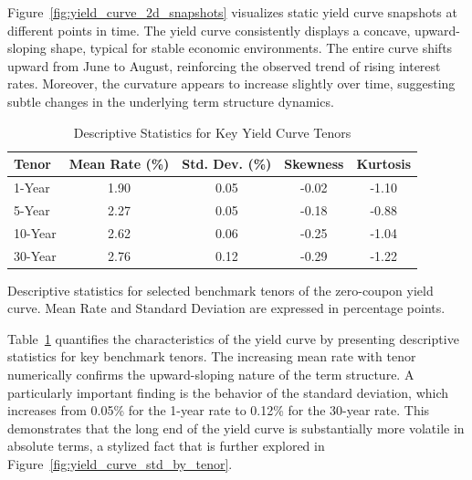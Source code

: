 Figure~\ref{fig:yield_curve_2d_snapshots} visualizes static yield curve snapshots at different points in time. The yield curve consistently displays a concave, upward-sloping shape, typical for stable economic environments. The entire curve shifts upward from June to August, reinforcing the observed trend of rising interest rates. Moreover, the curvature appears to increase slightly over time, suggesting subtle changes in the underlying term structure dynamics.

\begin{table}[H]
	\centering
	\begin{threeparttable}
		\caption{Descriptive Statistics for Key Yield Curve Tenors}
		\label{tab:yield_curve_summary}
		\begin{tabular}{lcccc}
			\toprule
			\textbf{Tenor} & \textbf{Mean Rate (\%)} & \textbf{Std. Dev. (\%)} & \textbf{Skewness} & \textbf{Kurtosis} \\
			\midrule
			1-Year         & 1.90                    & 0.05                    & -0.02             & -1.10             \\
			5-Year         & 2.27                    & 0.05                    & -0.18             & -0.88             \\
			10-Year        & 2.62                    & 0.06                    & -0.25             & -1.04             \\
			30-Year        & 2.76                    & 0.12                    & -0.29             & -1.22             \\
			\bottomrule
		\end{tabular}
		\begin{tablenotes}
			\footnotesize
			\item  Descriptive statistics for selected benchmark tenors of the zero-coupon yield curve. Mean Rate and Standard Deviation are expressed in percentage points.
		\end{tablenotes}
	\end{threeparttable}
\end{table}


Table~\ref{tab:yield_curve_summary} quantifies the characteristics of the yield curve by presenting descriptive statistics for key benchmark tenors. The increasing mean rate with tenor numerically confirms the upward-sloping nature of the term structure. A particularly important finding is the behavior of the standard deviation, which increases from 0.05\% for the 1-year rate to 0.12\% for the 30-year rate. This demonstrates that the long end of the yield curve is substantially more volatile in absolute terms, a stylized fact that is further explored in Figure~\ref{fig:yield_curve_std_by_tenor}.

